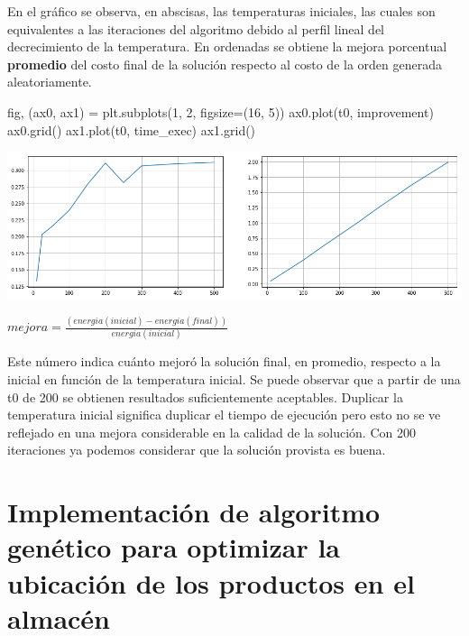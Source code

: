 \documentclass[
]{article}
\newenvironment{Shaded}{}{}
\newcommand{\DecValTok}[1]{\textcolor[rgb]{0.25,0.63,0.44}{#1}}
\newcommand{\NormalTok}[1]{#1}
\newcommand{\OperatorTok}[1]{\textcolor[rgb]{0.40,0.40,0.40}{#1}}
\begin{document}
En el gráfico se observa, en abscisas, las temperaturas iniciales, las
cuales son equivalentes a las iteraciones del algoritmo debido al perfil
lineal del decrecimiento de la temperatura. En ordenadas se obtiene la
mejora porcentual \textbf{promedio} del costo final de la solución
respecto al costo de la orden generada aleatoriamente.

\begin{Shaded}
\begin{Highlighting}[]
\NormalTok{fig, (ax0, ax1) }\OperatorTok{=}\NormalTok{ plt.subplots(}\DecValTok{1}\NormalTok{, }\DecValTok{2}\NormalTok{, figsize}\OperatorTok{=}\NormalTok{(}\DecValTok{16}\NormalTok{, }\DecValTok{5}\NormalTok{))}
\NormalTok{ax0.plot(t0, improvement)}
\NormalTok{ax0.grid()}
\NormalTok{ax1.plot(t0, time_exec)}
\NormalTok{ax1.grid()}
\end{Highlighting}
\end{Shaded}

\includegraphics{output_23_0.png}

\(mejora = \frac{(energia(inicial) - energia(final))}{energia(inicial)}\)

Este número indica cuánto mejoró la solución final, en promedio,
respecto a la inicial en función de la temperatura inicial. Se puede
observar que a partir de una t0 de 200 se obtienen resultados
suficientemente aceptables. Duplicar la temperatura inicial significa
duplicar el tiempo de ejecución pero esto no se ve reflejado en una
mejora considerable en la calidad de la solución. Con 200 iteraciones ya
podemos considerar que la solución provista es buena.

\hypertarget{implementaciuxf3n-de-algoritmo-genuxe9tico-para-optimizar-la-ubicaciuxf3n-de-los-productos-en-el-almacuxe9n}{%
\section{Implementación de algoritmo genético para optimizar la
ubicación de los productos en el
almacén}\label{implementaciuxf3n-de-algoritmo-genuxe9tico-para-optimizar-la-ubicaciuxf3n-de-los-productos-en-el-almacuxe9n}}
\end{document}

